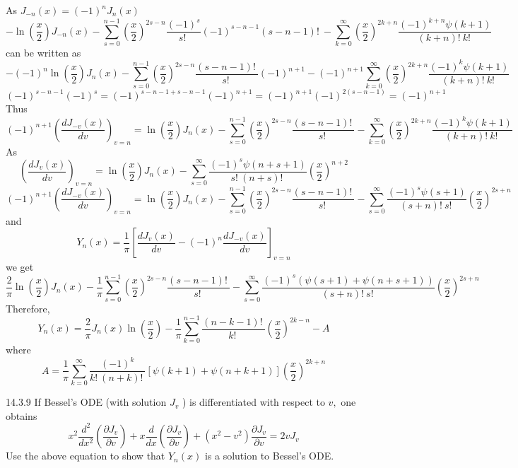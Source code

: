 \documentclass{article}
\begin{document}
\begin{flushleft}
As $J_{-n}(x)=(-1)^{n} J_{n}(x)$
$$-\ln \left(\frac{x}{2}\right) J_{-n}(x)-\sum_{s=0}^{n-1}\left(\frac{x}{2}\right)^{2 s-n} \frac{(-1)^{s}}{s ! \ }(-1)^{s-n-1}(s-n-1) ! \ -\sum_{k=0}^{\infty}\left(\frac{x}{2}\right)^{2 k+n} \frac{(-1)^{k+n} \psi(k+1)}{(k+n) ! \  k ! \ }$$ 
can be written as
$$-(-1)^{n} \ln \left(\frac{x}{2}\right) J_{n}(x)-\sum_{s=0}^{n-1}\left(\frac{x}{2}\right)^{2 s-n} \frac{(s-n-1) ! \ }{s ! \ }(-1)^{n+1}-(-1)^{n+1} \sum_{k=0}^{\infty}\left(\frac{x}{2}\right)^{2 k+n} \frac{(-1)^{k} \psi(k+1)}{(k+n) ! \  k ! \ }$$
$$(-1)^{s-n-1}(-1)^{s}=(-1)^{s-n-1+s-n-1}(-1)^{n+1}=(-1)^{n+1}(-1)^{2(s-n-1)}=(-1)^{n+1}$$
Thus
$$(-1)^{n+1}\left(\frac{d J_{-v}(x)}{d v}\right)_{v=n}=\ln \left(\frac{x}{2}\right) J_{n}(x)-\sum_{s=0}^{n-1}\left(\frac{x}{2}\right)^{2 s-n} \frac{(s-n-1) ! \ }{s ! \ }-\sum_{k=0}^{\infty}\left(\frac{x}{2}\right)^{2 k+n} \frac{(-1)^{k} \psi(k+1)}{(k+n) ! \  k ! \ }$$
As
$$
\left(\frac{d J_{v}(x)}{d v}\right)_{v=n}=\ln \left(\frac{x}{2}\right) J_{n}(x)-\sum_{s=0}^{\infty} \frac{(-1)^{s} \psi(n+s+1)}{s ! \ (n+s) ! \ }\left(\frac{x}{2}\right)^{n+2}
$$
$$
(-1)^{n+1}\left(\frac{d J_{-v}(x)}{d v}\right)_{v=n}=\ln \left(\frac{x}{2}\right) J_{n}(x)-\sum_{s=0}^{n-1}\left(\frac{x}{2}\right)^{2 s-n} \frac{(s-n-1) ! \ }{s ! \ }-\sum_{s=0}^{\infty} \frac{(-1)^{s} \psi(s+1)}{(s+n) ! \  s ! \ }\left(\frac{x}{2}\right)^{2 s+n}
$$
and
$$
Y_{n}(x)=\frac{1}{\pi}\left[\frac{d J_{v}(x)}{d v}-(-1)^{n} \frac{d J_{-v}(x)}{d v}\right]_{v=n}
$$
we get
$$
\frac{2}{\pi} \ln \left(\frac{x}{2}\right) J_{n}(x)-\frac{1}{\pi} \sum_{s=0}^{n-1}\left(\frac{x}{2}\right)^{2 s-n} \frac{(s-n-1) ! \ }{s ! \ }-\sum_{s=0}^{\infty} \frac{(-1)^{s}(\psi(s+1)+\psi(n+s+1))}{(s+n) ! \  s ! \ }\left(\frac{x}{2}\right)^{2 s+n}
$$
Therefore, 
$$Y_{n}(x)=\frac{2}{\pi} J_{n}(x) \ln \left(\frac{x}{2}\right)-\frac{1}{\pi} \sum_{k=0}^{n-1} \frac{(n-k-1) ! \ }{k ! \ }\left(\frac{x}{2}\right)^{2 k-n}-A$$ 
where
$$A=\frac{1}{\pi} \sum_{k=0}^{\infty} \frac{(-1)^{k}}{k ! \ (n+k) ! \ }[\psi(k+1)+\psi(n+k+1)]\left(\frac{x}{2}\right)^{2 k+n}$$

\newpage



\begin{mybox}{14.3.9}
If Bessel's ODE (with solution $J_{v}$ ) is differentiated with respect to $v,$ one obtains
$$
x^{2} \frac{d^{2}}{d x^{2}}\left(\frac{\partial J_{v}}{\partial v}\right)+x \frac{d}{d x}\left(\frac{\partial J_{v}}{\partial v}\right)+\left(x^{2}-v^{2}\right) \frac{\partial J_{v}}{\partial v}=2 v J_{v}
$$
Use the above equation to show that $Y_{n}(x)$ is a solution to Bessel's ODE.


\end{mybox}
\end{flushleft}
\end{document}
